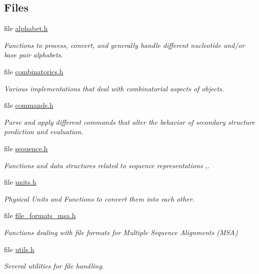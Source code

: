 \subsection*{Files}
\begin{DoxyCompactItemize}
\item 
file \hyperlink{alphabet_8h}{alphabet.\+h}
\begin{DoxyCompactList}\small\item\em Functions to process, convert, and generally handle different nucleotide and/or base pair alphabets. \end{DoxyCompactList}\item 
file \hyperlink{combinatorics_8h}{combinatorics.\+h}
\begin{DoxyCompactList}\small\item\em Various implementations that deal with combinatorial aspects of objects. \end{DoxyCompactList}\item 
file \hyperlink{commands_8h}{commands.\+h}
\begin{DoxyCompactList}\small\item\em Parse and apply different commands that alter the behavior of secondary structure prediction and evaluation. \end{DoxyCompactList}\item 
file \hyperlink{sequence_8h}{sequence.\+h}
\begin{DoxyCompactList}\small\item\em Functions and data structures related to sequence representations ,. \end{DoxyCompactList}\item 
file \hyperlink{units_8h}{units.\+h}
\begin{DoxyCompactList}\small\item\em Physical Units and Functions to convert them into each other. \end{DoxyCompactList}\item 
file \hyperlink{io_2file__formats__msa_8h}{file\+\_\+formats\+\_\+msa.\+h}
\begin{DoxyCompactList}\small\item\em Functions dealing with file formats for Multiple Sequence Alignments (M\+SA) \end{DoxyCompactList}\item 
file \hyperlink{io_2utils_8h}{utils.\+h}
\begin{DoxyCompactList}\small\item\em Several utilities for file handling. \end{DoxyCompactList}\item 

\end{DoxyCompactItemize}
